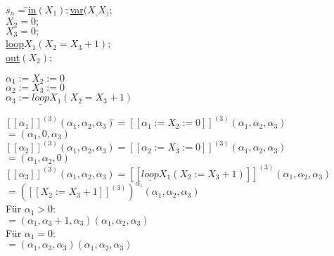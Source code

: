 \documentclass[11pt]{amsart}
\begin{document}
\begin{tabbing}
  $s_n = $\=$ $\underline{in}$ (X_1); $\underline{var}$(X_,X_);$ \\
  \>$ X_2 = 0;$ \\
  \>$ X_3 = 0;$ \\
  \>$ $\underline{loop}$ X_1(X_2 = X_3 + 1);$ \\
  \>$ $\underline{out}$ (X_2);$
\end{tabbing}
\vspace{0.5cm}
$\alpha_1 := X_2 := 0$ \\
$\alpha_2 := X_3 := 0$ \\
$\alpha_3 := \underline{loop} X_1(X_2 = X_3 + 1)$ \\
\begin{tabbing}
$[[\alpha_1]]^{(3)}(\alpha_1,\alpha_2,\alpha_3)$\=$ = [[\alpha_1 := X_2 := 0]]^{(3)}(\alpha_1,\alpha_2,\alpha_3)$ \\
$ $\>$   = (\alpha_1,0,\alpha_3)$ \\[0.3cm]
$[[\alpha_2]]^{(3)}(\alpha_1,\alpha_2,\alpha_3) = [[\alpha_2 := X_3 := 0]]^{(3)}(\alpha_1,\alpha_2,\alpha_3)$ \\
$  $\>$  = (\alpha_1,\alpha_2,0)$ \\[0.3cm]
$[[\alpha_3]]^{(3)}(\alpha_1,\alpha_2,\alpha_3) = [[\underline{loop} X_1(X_2 := X_3 + 1)]]^{(3)}(\alpha_1,\alpha_2,\alpha_3)$ \\
$   $\>$ = ([[X_2 := X_3 + 1]]^{(3)})^{\alpha_1}(\alpha_1,\alpha_2,\alpha_3)$ \\
Für $\alpha_1 > 0$: \\
\> $ = ( \alpha_1 , \alpha_3 + 1, \alpha_3)(\alpha_1,\alpha_2,\alpha_3)$ \\
Für $\alpha_1 = 0$: \\
\> $ = ( \alpha_1 , \alpha_3, \alpha_3)(\alpha_1,\alpha_2,\alpha_3)$ \\
\end{tabbing}
\end{document}
